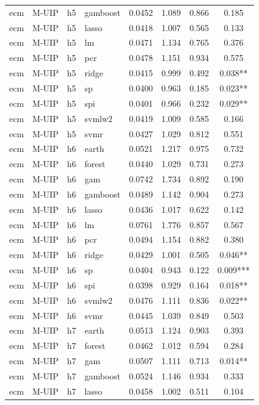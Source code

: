 \begin{ThreePartTable}
\begin{longtable}[t]{llclcccc}
ecm & M-UIP & h5 & gamboost & 0.0452 & 1.089 & 0.866 & 0.185\\
ecm & M-UIP & h5 & lasso & 0.0418 & 1.007 & 0.565 & 0.133\\
ecm & M-UIP & h5 & lm & 0.0471 & 1.134 & 0.765 & 0.376\\
ecm & M-UIP & h5 & pcr & 0.0478 & 1.151 & 0.934 & 0.575\\
ecm & M-UIP & h5 & ridge & 0.0415 & 0.999 & 0.492 & 0.038**\\
ecm & M-UIP & h5 & sp & 0.0400 & 0.963 & 0.185 & 0.023**\\
ecm & M-UIP & h5 & spi & 0.0401 & 0.966 & 0.232 & 0.029**\\
ecm & M-UIP & h5 & svmlw2 & 0.0419 & 1.009 & 0.585 & 0.166\\
ecm & M-UIP & h5 & svmr & 0.0427 & 1.029 & 0.812 & 0.551\\
\addlinespace
ecm & M-UIP & h6 & earth & 0.0521 & 1.217 & 0.975 & 0.732\\
ecm & M-UIP & h6 & forest & 0.0440 & 1.029 & 0.731 & 0.273\\
ecm & M-UIP & h6 & gam & 0.0742 & 1.734 & 0.892 & 0.190\\
ecm & M-UIP & h6 & gamboost & 0.0489 & 1.142 & 0.904 & 0.273\\
ecm & M-UIP & h6 & lasso & 0.0436 & 1.017 & 0.622 & 0.142\\
ecm & M-UIP & h6 & lm & 0.0761 & 1.776 & 0.857 & 0.567\\
ecm & M-UIP & h6 & pcr & 0.0494 & 1.154 & 0.882 & 0.380\\
ecm & M-UIP & h6 & ridge & 0.0429 & 1.001 & 0.505 & 0.046**\\
ecm & M-UIP & h6 & sp & 0.0404 & 0.943 & 0.122 & 0.009***\\
ecm & M-UIP & h6 & spi & 0.0398 & 0.929 & 0.164 & 0.018**\\
ecm & M-UIP & h6 & svmlw2 & 0.0476 & 1.111 & 0.836 & 0.022**\\
ecm & M-UIP & h6 & svmr & 0.0445 & 1.039 & 0.849 & 0.503\\
\addlinespace
ecm & M-UIP & h7 & earth & 0.0513 & 1.124 & 0.903 & 0.393\\
ecm & M-UIP & h7 & forest & 0.0462 & 1.012 & 0.594 & 0.284\\
ecm & M-UIP & h7 & gam & 0.0507 & 1.111 & 0.713 & 0.014**\\
ecm & M-UIP & h7 & gamboost & 0.0524 & 1.146 & 0.934 & 0.333\\
ecm & M-UIP & h7 & lasso & 0.0458 & 1.002 & 0.511 & 0.104\\

\end{longtable}
\end{ThreePartTable}
